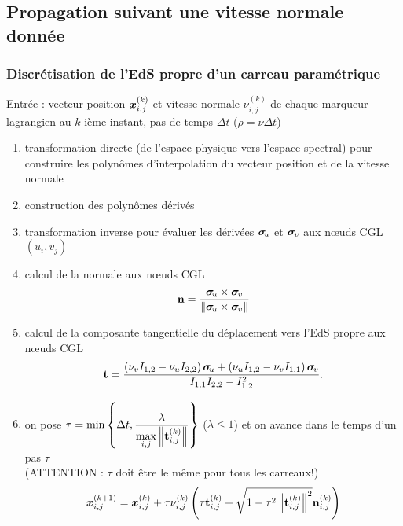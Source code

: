 \subsection{Propagation suivant une vitesse normale donnée}
\subsubsection{Discrétisation de l'EdS propre d'un carreau paramétrique}
\label{section:discretisation_EdS_propre_carreau}
Entrée : vecteur position $\bm{x}_{i,j}^{(k)}$ et vitesse normale $\nu_{i,j}^{(k)}$ de chaque marqueur lagrangien au $k$-ième instant, pas de temps $\Delta t$ (\ie $\rho = \nu \Delta t$)
\begin{enumerate}
	\item transformation directe (de l'espace physique vers l'espace spectral) pour construire les polynômes d'interpolation du vecteur position et de la vitesse normale
	\item construction des polynômes dérivés 
	\item transformation inverse pour évaluer les dérivées $\bm{\sigma}_{\mkern-3muu}$ et $\bm{\sigma}_{\mkern-2muv}$ aux n\oe uds CGL $(u_i,v_j)$
	\item calcul de la normale aux n\oe uds CGL
	\begin{equation}
		\mathbf{n} = \frac{{\bm{\sigma}_{\mkern-3muu}} \times {\bm{\sigma}_{\mkern-2muv}}}{\left\| {{\bm{\sigma}_{\mkern-3muu}} \times {\bm{\sigma}_{\mkern-2muv}}} \right\|}
	\end{equation}
	\item calcul de la composante tangentielle du déplacement vers l'EdS propre aux n\oe uds CGL
	\begin{equation}
		\mathbf{t} = \frac{
				\left( \nu_v I_{1,2} - \nu_u I_{2,2} \right) \bm{\sigma}_{\mkern-3muu} + 
				\left( \nu_u I_{1,2} - \nu_v I_{1,1} \right) \bm{\sigma}_{\mkern-2muv}
			}{
				I_{1,1} I_{2,2} - I_{1,2}^2
			}.
	\end{equation}
	\item on pose $\tau = \min\left\{\Delta t, \displaystyle\frac{\lambda}{\displaystyle\max_{i,j} \left\| {\mathbf{t}_{i,j}^{(k)} } \right\|} \right\}$ ($\lambda \leq 1$) et on avance dans le temps d'un pas $\tau$\\(ATTENTION : $\tau$ doit être le même pour tous les carreaux!)
	\begin{equation}
		\bm{x}_{i,j}^{(k+1)} = \bm{x}_{i,j}^{(k)} + \tau \nu_{i,j}^{(k)} 
		\left( 
			\tau \mathbf{t}_{i,j}^{(k)} + \sqrt{1 - \tau^2 \left\| {\mathbf{t}_{i,j}^{(k)}} \right\|^2} \mathbf{n}_{i,j}^{(k)}
		\right)
	\end{equation}
	

\end{enumerate}
